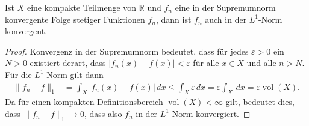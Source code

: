 \begin{satz}
Ist $X$ eine kompakte Teilmenge von $\mathbb{R}$ und $f_n$ eine
in der Supremumnorm konvergente Folge stetiger Funktionen $f_n$,
dann ist $f_n$ auch in der $L^1$-Norm konvergent.
\end{satz}

\begin{proof}
Konvergenz in der Supremumnorm bedeutet, dass für jedes $\varepsilon>0$
ein $N>0$ existiert derart, dass $|f_n(x)-f(x)|<\varepsilon$ für alle
$x\in X$ und alle $n>N$.
Für die $L^1$-Norm gilt dann
\begin{align*}
\|f_n-f\|_1
&=
\int_X |f_n(x) - f(x)|\,dx
\le
\int_X \varepsilon \,dx
=
\varepsilon \int_X \,dx
=
\varepsilon \operatorname{vol}(X).
\end{align*}
Da für einen kompakten Definitionsbereich $\operatorname{vol}(X)<\infty$
gilt, bedeutet dies, dass $\|f_n-f\|_1\to 0$, dass also $f_n$ in
der $L^1$-Norm konvergiert.
\end{proof}



